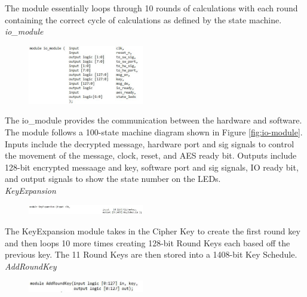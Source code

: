 \documentclass[journal, twocolumn, final,11pt,letterpaper]{IEEEtran}
\begin{document}
The module essentially loops through 10 rounds of calculations with each round containing the correct cycle of calculations as defined by the state machine. \\

\textit{io\_module}\\
\vspace{-4mm}

\begin{figure}[h]
	\centering
	\includegraphics[width=0.45\textwidth]{iomodule.jpg}
	\label{fig:iomodule}
\end{figure}

The io\_module provides the communication between the hardware and software.  The module follows a 100-state machine diagram shown in Figure \ref{fig:io-module}. Inputs include the decrypted message, hardware port and sig signals to control the movement of the message, clock, reset, and AES ready bit.  Outputs include 128-bit encrypted messaage and key, software port and sig signals, IO ready bit, and output signals to show the state number on the LEDs. \\

\textit{KeyExpansion}\\
\vspace{-4mm}

\begin{figure}[h]
	\centering
	\includegraphics[width=0.45\textwidth]{KeyExpansion.jpg}
	\label{fig:KeyExpansion}
\end{figure}

The KeyExpansion module takes in the Cipher Key to create the first round key and then loops 10 more times creating 128-bit Round Keys each based off the previous key.  The 11 Round Keys are then stored into a 1408-bit Key Schedule. \\  

\textit{AddRoundKey}\\
\vspace{-4mm}

\begin{figure}[h]
	\centering
	\includegraphics[width=0.45\textwidth]{AddRoundKey.jpg}
	\label{fig:AddRoundKey}
\end{figure}
\end{document}

